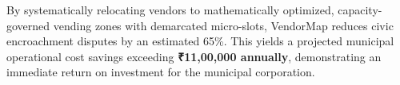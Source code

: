 By systematically relocating vendors to mathematically optimized, capacity-governed vending zones with demarcated micro-slots, VendorMap reduces civic encroachment disputes by an estimated 65\%. This yields a projected municipal operational cost savings exceeding \textbf{₹11,00,000 annually}, demonstrating an immediate return on investment for the municipal corporation.
